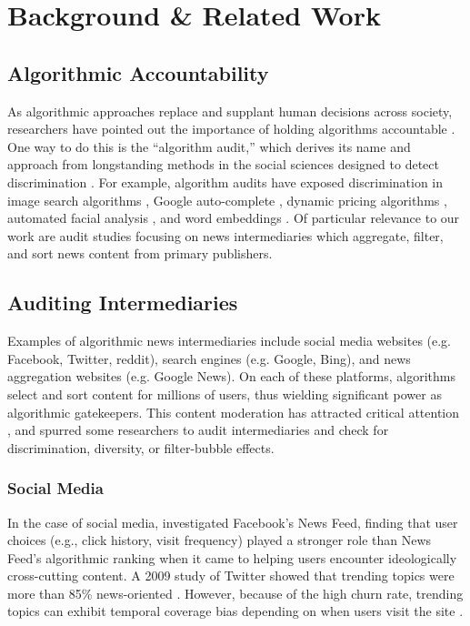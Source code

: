 \section{Background \& Related Work\label{sec:related}}

\subsection{Algorithmic Accountability}
As algorithmic approaches replace and supplant human decisions across society, researchers have pointed out the importance of holding algorithms accountable \citep{Gillespie2014,Diakopoulos2015,Garfinkel2017}. One way to do this is the ``algorithm audit,'' which derives its name and approach from longstanding methods in the social sciences designed to detect discrimination \citep{Sandvig2014}. For example, algorithm audits have exposed discrimination in image search algorithms \citep{Kay}, Google auto-complete \citep{Baker2013}, dynamic pricing algorithms \citep{Chen2016}, automated facial analysis \citep{Buolamwini2018}, and word embeddings \citep{Caliskan2017}. Of particular relevance to our work are audit studies focusing on news intermediaries which aggregate, filter, and sort news content from primary publishers.

\subsection{Auditing Intermediaries}
Examples of algorithmic news intermediaries include social media websites (e.g. Facebook, Twitter, reddit), search engines (e.g. Google, Bing), and news aggregation websites (e.g. Google News). On each of these platforms, algorithms select and sort content for millions of users, thus wielding significant power as algorithmic gatekeepers. This content moderation has attracted critical attention \citep{Gillespie2018}, and spurred some researchers to audit intermediaries and check for discrimination, diversity, or filter-bubble effects.

\subsubsection{Social Media}
In the case of social media, \citet{Bakshy} investigated Facebook's News Feed, finding that user choices (e.g., click history, visit frequency) played a stronger role than News Feed's algorithmic ranking when it came to helping users encounter ideologically cross-cutting content. A 2009 study of Twitter showed that trending topics were more than 85\% news-oriented \citep{Kwak2010}. However, because of the high churn rate, trending topics can exhibit temporal coverage bias depending on when users visit the site \citep{Chakraborty2015}.

